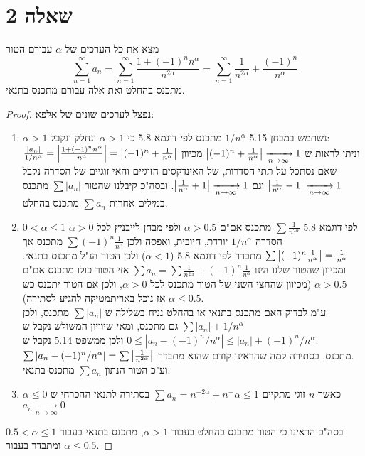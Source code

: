 \documentclass{article}
\begin{document}
		\section*{שאלה 2}
		מצא את כל הערכים של $\alpha$ עבורם הטור
		\[
			\sum^\infty_{n=1} a_n
			= \sum^\infty_{n=1} \frac{1 + (-1)^n n^\alpha}{n^{2\alpha}}
			= \sum^\infty_{n=1} \frac{1}{n^{2\alpha}} + \frac{(-1)^n}{n^\alpha}
		\]
		מתכנס בהחלט ואת אלה עבורם מתכנס בתנאי.
		\begin{proof}
			נפצל לערכים שונים של אלפא:
			\begin{enumerate}
				\item $\alpha > 1$ נשתמש במבחן 5.15 $1/n^\alpha$ מתכנס לפי דוגמא 5.8 כי $\alpha > 1$
				ונחלק ונקבל: \\
				$\frac{\left| a_n \right|}{1/n^\alpha} = \left| \frac{1 + (-1)^n n^\alpha}{n^{\alpha}} \right| = \left| (-1)^n + \frac{1}{n^\alpha} \right|$
				וניתן לראות ש $\left| (-1)^n + \frac{1}{n^\alpha} \right| \xrightarrow[n \to \infty]{} 1$ מכיוון
				שאם נסתכל על תתי הסדרות, של האינדקסים הזוגיים והאי זוגיים של הסדרה נקבל $\left| \frac{1}{n^\alpha} - 1 \right| \xrightarrow[n \to \infty]{} 1$ וגם $\left| \frac{1}{n^\alpha} + 1 \right| \xrightarrow[n \to \infty]{} 1$.
				ובסה"כ קיבלנו שהטור $\sum |a_n|$ מתכנס במילים אחרות $\sum a_n$ מתכנס בהחלט.

				\item $0 < \alpha \leq 1$ לפי דוגמא 5.8 $\sum \frac{1}{n^{2\alpha}}$ מתכנס אם"ם $\alpha > 0.5$ ולפי מבחן לייבניץ לכל $\alpha > 0$ הסדרה $1/n^\alpha$ יורדת, חיובית, ואפסה ולכן $\sum (-1)^n \frac{1}{n^\alpha}$ מתכנס אך $\sum \left| (-1)^n \frac{1}{n^\alpha} \right| = \frac{1}{n^\alpha}$ מתבדר לפי דוגמא 5.8 ($\alpha<1$) ולכן הטור הנ"ל מתכנס בתנאי.
				ומכיוון שהטור שלנו הינו $\sum a_n = \sum  \frac{1}{n^{2\alpha}} + (-1)^n \frac{1}{n^\alpha}$ אזי הטור כולו מתכנס אם"ם $\alpha>0.5$ (מכיוון שהחצי השני של הטור מתכנס לכל $\alpha>0$, ולכן אם הטור יתכנס כש $\alpha \leq 0.5$ אז נוכל באריתמטיקה להגיע לסתירה). \\
				ע"מ לבדוק האם מתכנס בתנאי או בהחלט נניח בשלילה ש $\sum |a_n|$ מתכנס, ולכן $\sum |a_n| + 1/n^\alpha$ גם מתכנס,
				ומאי שיוויון המשולש נקבל ש $0 \leq |a_n -  (-1)^n/n^\alpha| \leq |a_n| + (-1)^n/n^\alpha$ ולכן ממשפט 5.14 נקבל ש: \\
				$\sum |a_n - (-1)^n/n^\alpha| = \sum \left| \frac{1}{n^{2\alpha}} \right|$ מתכנס, בסתירה למה שהראינו קודם שהוא מתבדר. \\
				וע"כ הטור הנתון $\sum a_n$ מתכנס בתנאי.

				\item $\alpha \leq 0$ כאשר $n$ זוגי מתקיים $\sum a_n = n^{-2\alpha} + n^-\alpha \leq 1$ בסתירה לתנאי ההכרחי ש $a_n \xrightarrow[n \to \infty]{} 0$
			\end{enumerate}
			בסה"כ הראינו כי הטור מתכנס בהחלט בעבור $\alpha > 1$, מתכנס בתנאי בעבור $0.5 < \alpha \leq 1$ ומתבדר בעבור $\alpha \leq 0.5$.
		\end{proof}
\end{document}
